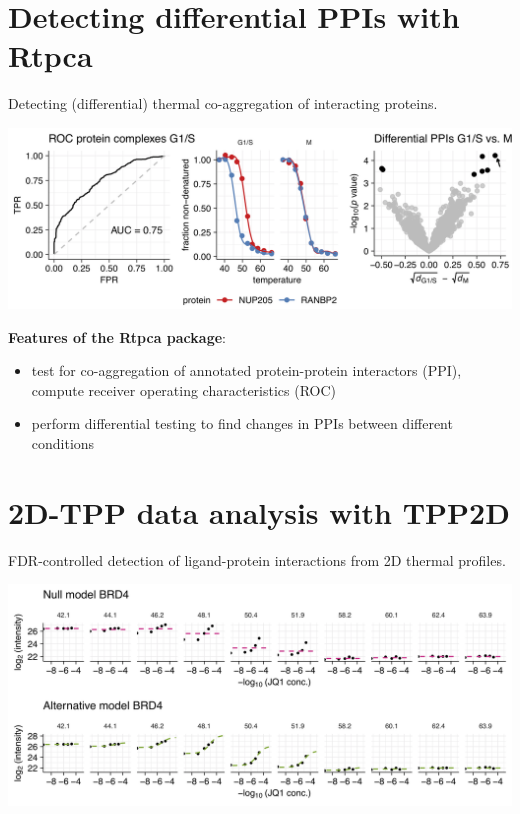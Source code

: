 \documentclass{article}
\newcommand{\hcode}[2][lgray]{{\ttfamily\color{vdgray}\colorbox{#1}{#2}}}
\begin{document}
\begin{multicols}{2}
\begin{minipage}[t]{\linewidth}
  \section*{\huge Detecting differential PPIs with \hcode{Rtpca} \cite{kurzawa_2020}}
  Detecting (differential) thermal co-aggregation of interacting proteins.
  \begin{center}
  \includegraphics[width=\linewidth]{figs/rtpca-tr_example.png}
  \end{center}
  \textbf{Features of the \hcode{Rtpca} package}:
  \begin{itemize}
%
  \item test for co-aggregation of annotated protein-protein interactors (PPI), compute receiver operating characteristics (ROC)
  \item perform differential testing to find changes in PPIs between different conditions
%
  \end{itemize}
\end{minipage}



\noindent
\begin{minipage}[t]{\linewidth}
  \vspace{0.55cm}
  \section*{\huge 2D-TPP data analysis with \hcode{TPP2D} \cite{kurzawa_2020a}}
  FDR-controlled detection of ligand-protein interactions from 2D thermal profiles.
  
  \begin{center}
  \includegraphics[width=\linewidth]{figs/tpp2d_example.png}
  \end{center}


\end{minipage}
\end{multicols}
\end{document}
